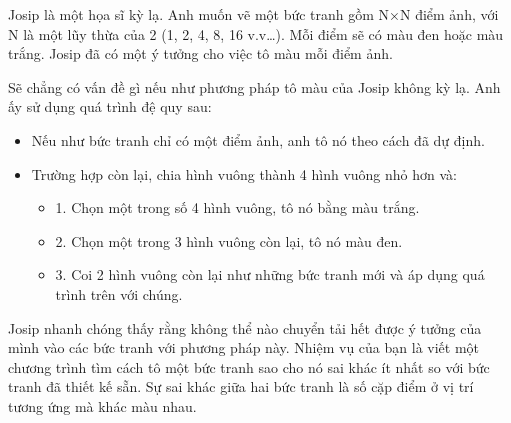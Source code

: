 Josip là một họa sĩ kỳ lạ. Anh muốn vẽ một bức tranh gồm N×N điểm ảnh, với N là một lũy thừa của 2 (1, 2, 4, 8, 16 v.v…). Mỗi điểm sẽ có màu đen hoặc màu trắng. Josip đã có một ý tưởng cho việc tô màu mỗi điểm ảnh.  

   Sẽ chẳng có vấn đề gì nếu như phương pháp tô màu của Josip không kỳ lạ. Anh ấy sử dụng quá trình đệ quy sau:  
\begin{itemize}
	\item     Nếu như bức tranh chỉ có một điểm ảnh, anh tô nó theo cách đã dự định.   
	\item     Trường hợp còn lại, chia hình vuông thành 4 hình vuông nhỏ hơn và:    
\begin{itemize}
	\item       1. Chọn một trong số 4 hình vuông, tô nó bằng màu trắng.     
	\item       2. Chọn một trong 3 hình vuông còn lại, tô nó màu đen.     
	\item       3. Coi 2 hình vuông còn lại như những bức tranh mới và áp dụng quá trình trên với chúng.     
\end{itemize}
\end{itemize}

   Josip nhanh chóng thấy rằng không thể nào chuyển tải hết được ý tưởng của mình vào các bức tranh với phương pháp này. Nhiệm vụ của bạn là viết một chương trình tìm cách tô một bức tranh sao cho nó sai khác ít nhất so với bức tranh đã thiết kế sẵn. Sự sai khác giữa hai bức tranh là số cặp điểm ở vị trí tương ứng mà khác màu nhau.  

\